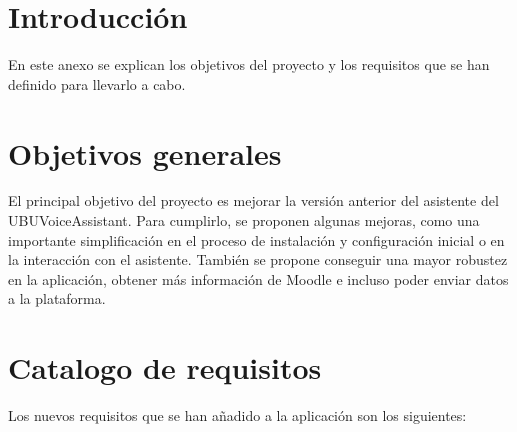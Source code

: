 
\section{Introducción}
En este anexo se explican los objetivos del proyecto y los requisitos que se han definido para llevarlo a cabo.

\section{Objetivos generales}
El principal objetivo del proyecto es mejorar la versión anterior del asistente del UBUVoiceAssistant. Para cumplirlo, se proponen algunas mejoras, como una importante simplificación en el proceso de instalación y configuración inicial o en la interacción con el asistente. También se propone conseguir una mayor robustez en la aplicación, obtener más información de Moodle e incluso poder enviar datos a la plataforma.

\section{Catalogo de requisitos}
Los nuevos requisitos que se han añadido a la aplicación son los siguientes:
